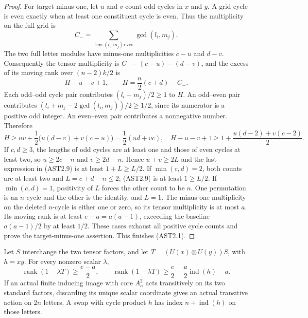 \begin{proof}
For target minus one, let $u$ and $v$ count odd cycles in $x$ and
$y$. A grid cycle is even exactly when at least one constituent
cycle is even. Thus the multiplicity on the full grid is
\[
 C_- =\sum_{\operatorname{lcm}(l_i,m_j)\ \text{even}}
                             \gcd(l_i,m_j).
                                                               \tag{AST2.7}
\]
The two full letter modules have minus-one multiplicities
$c-u$ and $d-v$. Consequently the tensor multiplicity is
$C_--(c-u)-(d-v)$, and the excess of its moving rank over
$(n-2)k/2$ is
\[
 H-u-v+1,\qquad H=\frac n2(c+d)-C_-.
                                                               \tag{AST2.8}
\]
Each odd--odd cycle pair contributes $(l_i+m_j)/2\ge1$ to
$H$. An odd--even pair contributes
$(l_i+m_j-2\gcd(l_i,m_j))/2\ge1/2$, since its numerator
is a positive odd integer. An even--even pair contributes
a nonnegative number. Therefore
\[
 H\ge uv+\frac12\bigl(u(d-v)+v(c-u)\bigr)
      =\frac12(ud+vc),
\quad
 H-u-v+1\ge1+\frac{u(d-2)+v(c-2)}2.
                                                               \tag{AST2.9}
\]
If $c,d\ge3$, the lengths of odd cycles are at least one and
those of even cycles at least two, so
$u\ge2c-n$ and $v\ge2d-n$. Hence $u+v\ge2L$ and the
last expression in (AST2.9) is at least $1+L\ge L/2$.
If $\min(c,d)=2$, both counts are at least two and
$L=c+d-n\le2$; (AST2.9) is at least $1\ge L/2$.
If $\min(c,d)=1$, positivity of $L$ forces the other count
to be $n$. One permutation is an $n$-cycle and the other is
the identity, and $L=1$. The minus-one multiplicity on the
deleted $n$-cycle is either one or zero, so its tensor
multiplicity is at most $a$. Its moving rank is at least
$e-a=a(a-1)$, exceeding the baseline $a(a-1)/2$ by at least
$1/2$. These cases exhaust all positive cycle counts and prove
the target-minus-one assertion. This finishes (AST2.1).
\end{proof}

\begin{lemma}
\label{HD-AST-08}
Let $S$ interchange the two tensor factors, and let
$T=(U(x)\otimes U(y))S$, with $h=xy$.
For every nonzero scalar $\lambda$,
\[
 \operatorname{rank}(1-\lambda T)
   \ge\frac{e-a}{2},
 \qquad
 \operatorname{rank}(1-\lambda T)
   \ge\frac e2+\frac a2\operatorname{ind}(h)-a.
                                                               \tag{AST2.10}
\]
If an actual finite inducing image with core $A_n^2$ acts
transitively on its two standard factors, discarding its unique
scalar coordinate gives an actual transitive action on $2n$ letters.
A swap with cycle product $h$ has index
$n+\operatorname{ind}(h)$ on those letters.
\end{lemma}

